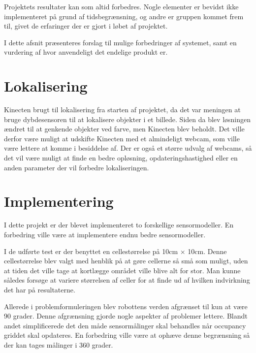 Projektets resultater kan som altid forbedres.
Nogle elementer er bevidst ikke implementeret på grund af tidsbegrænsning, og andre er gruppen kommet frem til, givet de erfaringer der er gjort i løbet af projektet.

I dette afsnit præsenteres forslag til mulige forbedringer af systemet, samt en vurdering af hvor anvendeligt det endelige produkt er.

\section{Lokalisering}
Kinecten brugt til lokalisering fra starten af projektet, da det var meningen at bruge dybdesensoren til at lokalisere objekter i et billede.
Siden da blev løsningen ændret til at genkende objekter ved farve, men Kinecten blev beholdt.
Det ville derfor være muligt at udskifte Kinecten med et almindeligt webcam, som ville være lettere at komme i besiddelse af. 
Der er også et større udvalg af webcams, så det vil være muligt at finde en bedre opløsning, opdateringshastighed eller en anden parameter der vil forbedre lokaliseringen.

\section{Implementering}
I dette projekt er der blevet implementeret to forskellige sensormodeller. 
En forbedring ville være at implementere endnu bedre sensormodeller.

I de udførte test er der benyttet en cellestørrelse på 10cm $ \times $ 10cm.
Denne cellestørrelse blev valgt med henblik på at gøre cellerne så små som muligt, uden at tiden det ville tage at kortlægge området ville blive alt for stor.
Man kunne således forsøge at variere størrelsen af celler for at finde ud af hvilken indvirkning det har på resultaterne.

Allerede i problemformuleringen blev robottens verden afgrænset til kun at være 90 grader. 
Denne afgrænsning gjorde nogle aspekter af problemer lettere. 
Blandt andet simplificerede det den måde sensormålinger skal behandles når occupancy griddet skal opdateres.
En forbedring ville være at ophæve denne begrænsning så der kan tages målinger i 360 grader.

